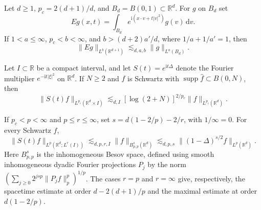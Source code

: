 Let $d\geq 1$, $p_c=2(d+1)/d$, and $B_d=B(0,1)\subset\mathbb R^d$. For $g$ on $B_d$ set
\[
Eg(x,t)=\int_{B_d}e^{\mathrm i(x\cdot v+t|v|^2)}g(v)\,\mathrm dv.
\]
If $1<a\leq\infty$, $p_c<b<\infty$, and $b>(d+2)a'/d$, where $1/a+1/a'=1$, then
\[
\|Eg\|_{L^b(\mathbb R^{d+1})}\lesssim_{d,a,b}\|g\|_{L^a(B_d)}.
\]

Let $I\subset\mathbb R$ be a compact interval, and let $S(t)=e^{\mathrm i t\Delta}$ denote the Fourier multiplier $e^{-\mathrm i t|\xi|^2}$ on $\mathbb R^d$. If $N\geq 2$ and $f$ is Schwartz with $\operatorname{supp}\widehat f\subset B(0,N)$, then
\[
\|S(t)f\|_{L^{p_c}(\mathbb R^d\times I)}
 \lesssim_{d,I}[\log(2+N)]^{2/p_c}\|f\|_{L^{p_c}(\mathbb R^d)}.
\]

If $p_c<p<\infty$ and $p\leq r\leq\infty$, set $s=d(1-2/p)-2/r$, with $1/\infty=0$. For every Schwartz $f$,
\[
\|S(t)f\|_{L^p(\mathbb R^d;L^r(I))}
 \lesssim_{d,p,r,I}\|f\|_{B^s_{p,p}(\mathbb R^d)}
 \lesssim_{d,p,s}\|(1-\Delta)^{s/2}f\|_{L^p(\mathbb R^d)}.
\]
Here $B^s_{p,p}$ is the inhomogeneous Besov space, defined using smooth inhomogeneous dyadic Fourier projections $P_j$ by the norm $(\sum_{j\geq 0}2^{jsp}\|P_jf\|_p^p)^{1/p}$. The cases $r=p$ and $r=\infty$ give, respectively, the spacetime estimate at order $d-2(d+1)/p$ and the maximal estimate at order $d(1-2/p)$.
